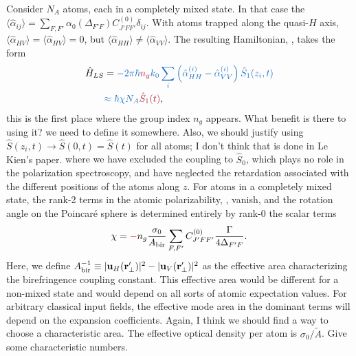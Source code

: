 \documentclass[preprint,aps,pra,onecolumn]{revtex4-1} %
\newcommand{\charpol}{\alpha_0(\Delta_{F'F})}
\newcommand{\Abiref}{A_{\rm bir}}
\newcommand{\change}[1]{{\color{RoyalBlue} #1}}
\newcommand{\comment}[1]{{\color{Maroon} #1}}
\newcommand{\error}[1]{{\color{red} #1}}
\begin{document}
Consider $N_A$ atoms, each in a completely mixed state.  \change{ In that case the $\langle \hat{\alpha}_{ij} \rangle = \sum_{F,F'} \charpol C_{J'FF'}^{(0)} \delta_{ij}$.  With atoms trapped along the quasi-$H$ axis, $\langle \hat{\alpha}_{HV} \rangle = \langle \hat{\alpha}_{HV} \rangle =0$, but  $\langle \hat{\alpha}_{HH} \rangle \neq  \langle \hat{\alpha}_{VV} \rangle$. } The resulting Hamiltonian, , takes the form
\begin{align}
\hat{H}_{LS} &= \change{-2\pi \hbar  \comment{n_g} k_0 \sum_i \left(\hat{\alpha}^{(i)}_{HH}  - \hat{\alpha}^{(i)}_{VV}\right)\hat{S}_1(z_i,t) } \\
	& \change{\approx \hbar \chi N_A \comment{ \hat{S}_1(t) } }, \label{Eq::MixedHamiltonian}
\end{align}
\comment{ this is the first place where the group index $n_g$ appears. What benefit is there to using it?  we need to define it somewhere.  Also, we should justify using $\hat{S}(z_i,t) \rightarrow \hat{S}(0,t) = \hat{S}(t) $ for all atoms; I don't think that is done in Le Kien's paper.}  where we have excluded the coupling to $\hat{S}_0$, which plays no role in the polarization spectroscopy, and have neglected the retardation associated with the different positions of the atoms along $z$.  \change{For atoms in a completely mixed state, the rank-2 terms in the atomic polarizability, \erf{Eq::PolarizabilityIrrep}, vanish, and the rotation angle on the Poincar\'{e} sphere is determined entirely by rank-0 the scalar terms}
	\begin{equation} \label{Eq::RotationAngle}
		\chi = \error{-}n_g  \frac{\sigma_0}{\Abiref}  \sum_{F,F'}  C_{J'FF'}^{(0)} \frac{\Gamma}{4 \Delta_{F'F}}.
	\end{equation}
Here, we define $\Abiref^{-1} \equiv |\mathbf{u}_{H}(\br'_\perp)|^2 - |\mathbf{u}_{V}(\br'_\perp)| ^2 $ as the effective area characterizing the birefringence coupling constant. \comment{ This effective area would be different for a non-mixed state and would depend on all sorts of atomic expectation values.  For arbitrary classical input fields, the effective mode area in the dominant terms will depend on the expansion coefficients.  Again, I think we should find a way to choose a characteristic area.} The effective optical density per atom is $\sigma_0/\tilde{A}$.  {\color{red}  Give some characteristic numbers.}  
\end{document}
